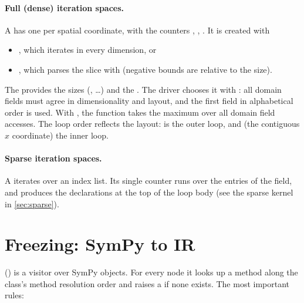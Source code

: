 \paragraph{Full (dense) iteration spaces.}
A  has one  per
spatial coordinate, with the counters , , . It is
created with
\begin{itemize}
  \item {}, which
        iterates \code{[gl_low, size - gl_high)} in every dimension, or
  \item {}, which parses
        the slice with  (negative bounds are relative to the
        size).
\end{itemize}
The  provides the sizes (, \dots) and the
. The driver chooses it with : all domain
fields must agree in dimensionality and layout, and the first field in alphabetical
order is used. With , the function 
takes the maximum  over all domain field accesses.
The loop order  reflects the  layout:  is the outer
loop, and  (the contiguous $x$ coordinate) the inner loop.

\paragraph{Sparse iteration spaces.}
A  iterates over an index list. Its single counter
 runs over the entries of the  field, and
 produces the declarations
 at the top of the loop body (see the sparse
kernel in \cref{sec:sparse}).

\section{Freezing: SymPy to IR}\label{sec:freeze}

 () is a visitor over SymPy objects. For every
node it looks up a method  along the class's method resolution
order and raises a  if none exists. The most important rules:

